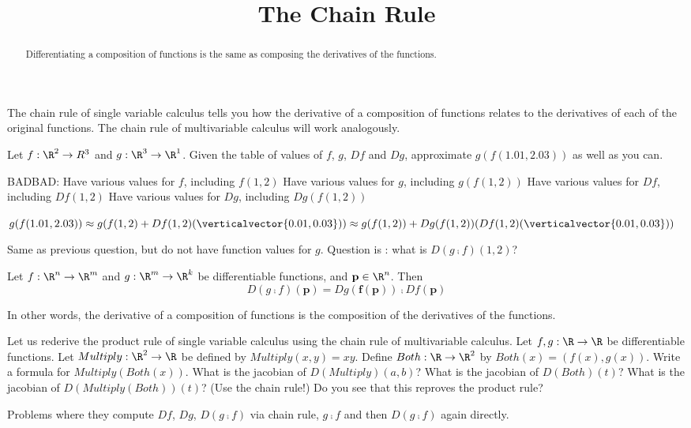 \documentclass{ximera}
\title{The Chain Rule}
\begin{document}
\begin{abstract}
	Differentiating a composition of functions is the same as composing the derivatives of the functions.
\end{abstract}

The chain rule of single variable calculus tells you how the derivative of a composition of functions relates to the derivatives of each of the original functions.
The chain rule of multivariable calculus will work analogously.

\begin{question}
	Let $f:\R^2 \to R^3$ and $g:\R^3 \to \R^1$.  Given the table of values of $f$, $g$, $Df$ and $Dg$, approximate $g(f(1.01,2.03))$ as well as you can.
	
	BADBAD: 
	Have various values for $f$, including $f(1,2)$
	Have various values for $g$, including $g(f(1,2))$
	Have various values for $Df$, including $Df(1,2)$
	Have various values for $Dg$, including $Dg(f(1,2))$
	\begin{answer}
		$g(f(1.01,2.03)) \approx g(f(1,2)+ Df(1,2)(\verticalvector{0.01,0.03}))
								 \approx g(f(1,2))+ Dg(f(1,2))(Df(1,2)(\verticalvector{0.01,0.03}))$
	\end{answer}
\end{question}

\begin{question}
	Same as previous question, but do not have function values for $g$.  Question is :  what is $D(g \comp f)(1,2)$?
\end{question}

\begin{theorem}
	Let $f:\R^n \to \R^m$ and $g: \R^m \to \R^k$ be differentiable functions, and $\mathbf{p} \in \R^n$.  Then 
	\[
		D(g \comp f)(\mathbf{p}) = Dg(\mathbf{f(p)}) \comp Df(\mathbf{p})
	\]
	
	In other words, the derivative of a composition of functions is the composition of the derivatives of the functions.
\end{theorem}

\begin{question}
	Let us rederive the product rule of single variable calculus using the chain rule of multivariable calculus.
	Let $f,g:\R \to \R$ be differentiable functions.  Let $Multiply:\R^2 \to \R$ be defined by $Multiply(x,y) = xy$.  
	Define $Both:\R \to \R^2$  by $Both(x) = (f(x),g(x))$. 
	Write a formula for $Multiply(Both(x))$.
	What is the jacobian of $D(Multiply)(a,b)$?
	What is the jacobian of $D(Both)(t)$?
	What is the jacobian of $D(Multiply(Both))(t)$? (Use the chain rule!)
	Do you see that this reproves the product rule?
\end{question}

\begin{question}
	Problems where they compute $Df$, $Dg$,  $D(g \comp f)$ via chain rule, $g \comp f$ and then $D(g \comp f)$ again directly.
\end{question}
\end{document}

